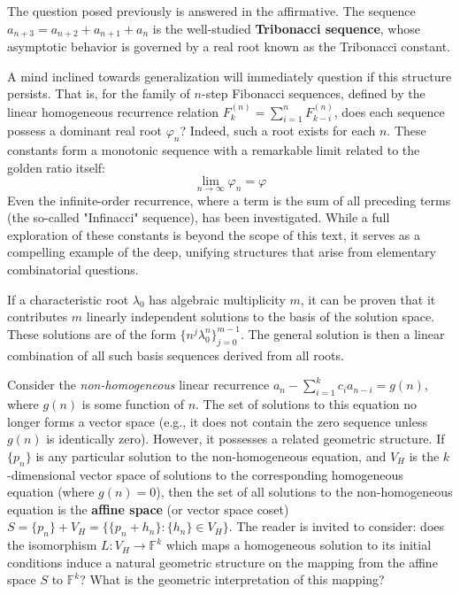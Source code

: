 \begin{remark}
The question posed previously is answered in the affirmative. The sequence $a_{n+3} = a_{n+2} + a_{n+1} + a_n$ is the well-studied \textbf{Tribonacci sequence}, whose asymptotic behavior is governed by a real root known as the Tribonacci constant.

A mind inclined towards generalization will immediately question if this structure persists. That is, for the family of $n$-step Fibonacci sequences, defined by the linear homogeneous recurrence relation $F_k^{(n)} = \sum_{i=1}^n F_{k-i}^{(n)}$, does each sequence possess a dominant real root $\varphi_n$? Indeed, such a root exists for each $n$. These constants form a monotonic sequence with a remarkable limit related to the golden ratio itself:
$$ \lim_{n\to\infty} \varphi_n = \varphi $$
Even the infinite-order recurrence, where a term is the sum of all preceding terms (the so-called "Infinacci" sequence), has been investigated. While a full exploration of these constants is beyond the scope of this text, it serves as a compelling example of the deep, unifying structures that arise from elementary combinatorial questions.
\end{remark}

\begin{remark}
If a characteristic root $\lambda_0$ has algebraic multiplicity $m$, it can be proven that it contributes $m$ linearly independent solutions to the basis of the solution space. These solutions are of the form $\{n^j \lambda_0^n\}_{j=0}^{m-1}$. The general solution is then a linear combination of all such basis sequences derived from all roots.
\end{remark}

\begin{remark}
Consider the \textit{non-homogeneous} linear recurrence $a_n - \sum_{i=1}^{k} c_i a_{n-i} = g(n)$, where $g(n)$ is some function of $n$. The set of solutions to this equation no longer forms a vector space (e.g., it does not contain the zero sequence unless $g(n)$ is identically zero). However, it possesses a related geometric structure. If $\{p_n\}$ is any particular solution to the non-homogeneous equation, and $V_H$ is the $k$-dimensional vector space of solutions to the corresponding homogeneous equation (where $g(n)=0$), then the set of all solutions to the non-homogeneous equation is the \textbf{affine space} (or vector space coset) $S = \{p_n\} + V_H = \{ \{p_n + h_n\} : \{h_n\} \in V_H \}$. The reader is invited to consider: does the isomorphism $L: V_H \to \mathbb{F}^k$ which maps a homogeneous solution to its initial conditions induce a natural geometric structure on the mapping from the affine space $S$ to $\mathbb{F}^k$? What is the geometric interpretation of this mapping?
\end{remark}

